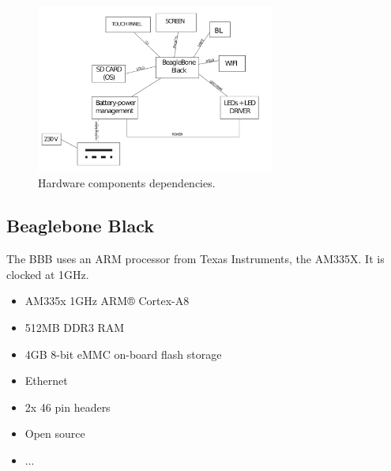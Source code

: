 \begin{figure}[!htb]
    \centering
    \includegraphics[width=0.7\textwidth,keepaspectratio]{chap/hardfig/overall_hardware_dependecies}
    \caption{Hardware components dependencies.}
    \label{fig:hardware dependencies}
\end{figure}

\subsection{Beaglebone Black}
The BBB uses an ARM processor from Texas Instruments, the AM335X. It is clocked at 1GHz.
\begin{itemize}
  \item{ AM335x 1GHz ARM® Cortex-A8 }
  \item{512MB DDR3 RAM}
  \item{4GB 8-bit eMMC on-board flash storage}
  \item{Ethernet}
  \item{2x 46 pin headers}
  \item{Open source}
  \item{...}
\end{itemize}




